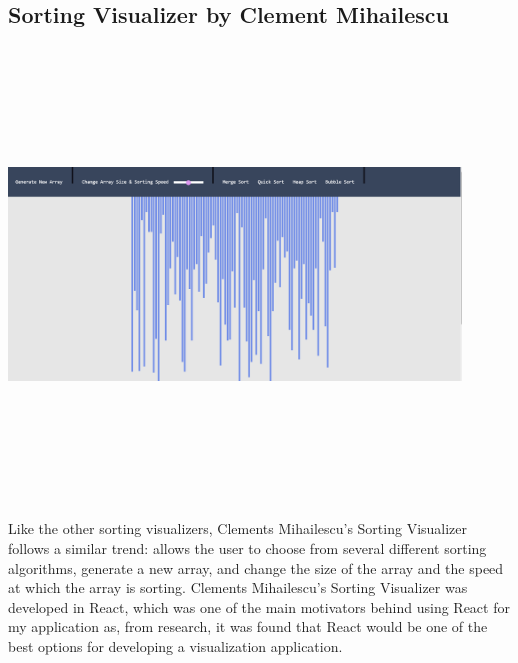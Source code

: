 \subsection{Sorting Visualizer by Clement Mihailescu}
\begin{center}
    \includegraphics[width=12cm,height=12cm,keepaspectratio]{images/sortvisclement}
\end{center}
Like the other sorting visualizers, Clements Mihailescu's Sorting Visualizer \cite{sorting_1} follows a similar trend: allows the user to choose from several different sorting algorithms, generate a new array, and change the size of the array and the speed at which the array is sorting. Clements Mihailescu's Sorting Visualizer was developed in React, which was one of the main motivators behind using React for my application as, from research, it was found that React would be one of the best options for developing a visualization application.

